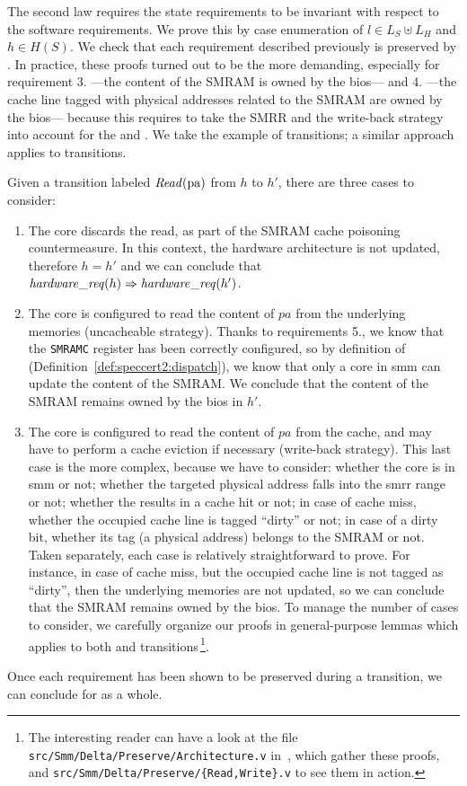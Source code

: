 The second law requires the state requirements to be invariant with respect to
the software requirements.
%
We prove this by case enumeration of \( l \in L_S \uplus L_H \) and
\( h \in H(S) \). We check that each requirement described previously is
preserved by .
%
In practice, these proofs turned out to be the more demanding, especially for
requirement 3. ---the content of the SMRAM is owned by the \ac{bios}--- and
4. ---the cache line tagged with physical addresses related to the SMRAM are
owned by the \ac{bios}--- because this requires to take the SMRR and the
write-back strategy into account for the  and .
%
We take the example of  transitions; a similar approach applies to
 transitions.

Given a transition labeled \( \mathit{Read}(\mathrm{pa}) \) from \( h \) to \( h' \),
there are three cases to consider:
%
\begin{enumerate}
\item The core discards the read, as part of the SMRAM cache poisoning
  countermeasure.
  In this context, the hardware architecture is not updated, therefore
  \( h = h' \) and we can conclude that
  \( \mathit{hardware\_req}(h) \Rightarrow \mathit{hardware\_req}(h') \).
\item The core is configured to read the content of \( pa \) from the underlying
  memories (uncacheable strategy).
  Thanks to requirements 5., we know that the \texttt{SMRAMC} register has been
  correctly configured, so by definition of 
  (Definition~\ref{def:speccert2:dispatch}), we know that only a core in
  \ac{smm} can update the content of the SMRAM.
  We conclude that the content of the SMRAM remains owned by the \ac{bios} in
  \( h' \).
\item The core is configured to read the content of \( pa \) from the cache, and
  may have to perform a cache eviction if necessary (write-back strategy).
  This last case is the more complex, because we have to consider:
  whether the core is in \ac{smm} or not;
  whether the targeted physical address falls into the \ac{smrr} range or not;
  whether the \IO results in a cache hit or not;
  in case of cache miss, whether the occupied cache line is tagged ``dirty'' or
  not;
  in case of a dirty bit, whether its tag (a physical address) belongs to the
  SMRAM or not.
  Taken separately, each case is relatively straightforward to prove.
  For instance, in case of cache miss, but the occupied cache line is not tagged
  as ``dirty'', then the underlying memories are not updated, so we can conclude
  that the SMRAM remains owned by the \ac{bios}.
  To manage the number of cases to consider, we carefully organize our proofs in
  general-purpose lemmas which applies to both  and 
  transitions\,\footnote{The interesting reader can have a look at the file
    \texttt{src/Smm/Delta/Preserve/Architecture.v}
    in~\cite{letan2016speccertcode}, which gather these proofs, and
    \texttt{src/Smm/Delta/Preserve/\{Read,Write\}.v} to see them in action.}.
\end{enumerate}
%
Once each requirement has been shown to be preserved during a transition, we can
conclude for  as a whole.


